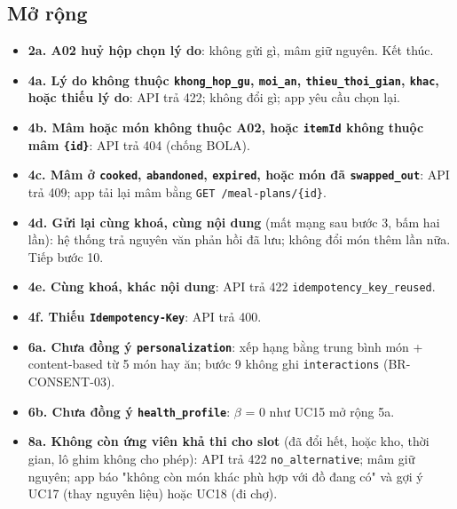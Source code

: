 \subsection{Mở rộng}
\begin{itemize}
\item \textbf{2a. A02 huỷ hộp chọn lý do}: không gửi gì, mâm giữ nguyên. Kết thúc.
\item \textbf{4a. Lý do không thuộc {\small\texttt{khong\_\allowbreak{}\allowbreak{}hop\_\allowbreak{}\allowbreak{}gu}}, {\small\texttt{moi\_\allowbreak{}\allowbreak{}an}}, {\small\texttt{thieu\_\allowbreak{}\allowbreak{}thoi\_\allowbreak{}\allowbreak{}gian}}, {\small\texttt{khac}}, hoặc thiếu lý do}: API trả 422; không đổi gì; app yêu cầu chọn lại.
\item \textbf{4b. Mâm hoặc món không thuộc A02, hoặc {\small\texttt{itemId}} không thuộc mâm {\small\texttt{\{id\}}}}: API trả 404 (chống BOLA).
\item \textbf{4c. Mâm ở {\small\texttt{cooked}}, {\small\texttt{abandoned}}, {\small\texttt{expired}}, hoặc món đã {\small\texttt{swapped\_\allowbreak{}\allowbreak{}out}}}: API trả 409; app tải lại mâm bằng {\small\texttt{GET /\allowbreak{}\allowbreak{}meal-\allowbreak{}plans/\allowbreak{}\allowbreak{}\{id\}}}.
\item \textbf{4d. Gửi lại cùng khoá, cùng nội dung} (mất mạng sau bước 3, bấm hai lần): hệ thống trả nguyên văn phản hồi đã lưu; không đổi món thêm lần nữa. Tiếp bước 10.
\item \textbf{4e. Cùng khoá, khác nội dung}: API trả 422 {\small\texttt{idempotency\_\allowbreak{}\allowbreak{}key\_\allowbreak{}\allowbreak{}reused}}.
\item \textbf{4f. Thiếu {\small\texttt{Idempotency-\allowbreak{}Key}}}: API trả 400.
\item \textbf{6a. Chưa đồng ý {\small\texttt{personalization}}}: xếp hạng bằng trung bình món + content-\allowbreak{}based từ 5 món hay ăn; bước 9 không ghi {\small\texttt{interactions}} (BR-\allowbreak{}CONSENT-\allowbreak{}03).
\item \textbf{6b. Chưa đồng ý {\small\texttt{health\_\allowbreak{}\allowbreak{}profile}}}: \ensuremath{\beta} = 0 như UC15 mở rộng 5a.
\item \textbf{8a. Không còn ứng viên khả thi cho slot} (đã đổi hết, hoặc kho, thời gian, lô ghim không cho phép): API trả 422 {\small\texttt{no\_\allowbreak{}\allowbreak{}alternative}}; mâm giữ nguyên; app báo "không còn món khác phù hợp với đồ đang có" và gợi ý UC17 (thay nguyên liệu) hoặc UC18 (đi chợ).

\end{itemize}
